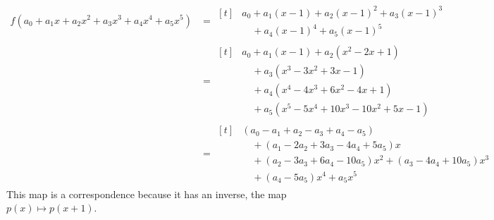 \begin{exercises}
\begin{answer}
\begin{align*}
        f(a_0+a_1x+a_2x^2+a_3x^3+a_4x^4+a_5x^5)
        &=\begin{aligned}[t]
             &a_0+a_1(x-1)+a_2(x-1)^2+a_3(x-1)^3 \\
             &\mbox{}\quad +a_4(x-1)^4+a_5(x-1)^5 
          \end{aligned}                                          \\
        &=\begin{aligned}[t]
             &a_0+a_1(x-1)+a_2(x^2-2x+1)         \\
             &\mbox{}\quad +a_3(x^3-3x^2+3x-1)   \\
             &\mbox{}\quad +a_4(x^4-4x^3+6x^2-4x+1) \\
             &\mbox{}\quad +a_5(x^5-5x^4+10x^3-10x^2+5x-1)
           \end{aligned}   \\
        &=\begin{aligned}[t]
           &(a_0-a_1+a_2-a_3+a_4-a_5)  \\
           &\mbox{}\quad +(a_1-2a_2+3a_3-4a_4+5a_5)x  \\
           &\mbox{}\quad +(a_2-3a_3+6a_4-10a_5)x^2
                        +(a_3-4a_4+10a_5)x^3         \\
           &\mbox{}\quad +(a_4-5a_5)x^4
                        +a_5x^5
          \end{aligned}
      \end{align*}
      This map is a correspondence because it has an inverse, the map
      \( p(x)\mapsto p(x+1) \).


\end{answer}
\end{exercises}
